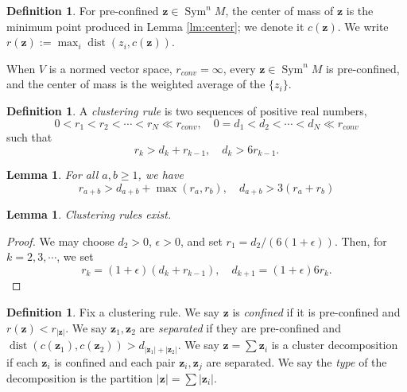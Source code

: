 \documentclass{article}
\def\C{\mathbb{C}}
\DeclareMathOperator{\Sym}{Sym}
\DeclareMathOperator{\dist}{dist}
\def\bz{\mathbf{z}} %
\newtheorem{lemma}[theorem]{Lemma}
\theoremstyle{definition}
\newtheorem{definition}
[theorem]{Definition}
\begin{document}
\begin{definition}
    For pre-confined $\bz \in \Sym^n M$,  the center of mass of $\bz$ is the minimum point produced in Lemma \ref{lm:center}; we denote it $c(\bz)$.  We write $r(\bz) := \max_{i} \dist(z_i, c(\mathbf{z}))$. 
\end{definition}

When $V$ is a normed vector space, $r_{conv} = \infty$, every $\mathbf{z} \in \Sym^n M$ is pre-confined, and the center of mass is the weighted average of the $\{z_i\}$. 




\begin{definition} \label{def: clustering rule}
    A {\em clustering rule} is two sequences of positive real numbers, 
    $$ 0 < r_1 < r_2  <\cdots < r_N \ll r_{conv}, \quad 0 = d_1 < d_2 < \cdots < d_N \ll r_{conv}$$
    such that 
    $$ r_k > d_k + r_{k-1}, \quad d_k > 6 r_{k-1}. $$ 
\end{definition}
\begin{lemma}
        For all $a,b \geq 1$, we have
$$ r_{a+b} > d_{a+b} + \max(r_a, r_b), \quad d_{a+b} > 3 (r_a + r_b)$$
\end{lemma}
\begin{lemma}
Clustering rules exist. 
\end{lemma}
\begin{proof}
We may choose $d_2 > 0$, $\epsilon > 0$, and set $r_1 = d_2/(6(1+\epsilon))$.  Then,  for $k = 2, 3, \cdots$, we set  
$$ r_k = (1+\epsilon) (d_k +  r_{k-1}), \quad d_{k+1} = (1+\epsilon) 6 r_{k}. $$ 
\end{proof}



\begin{definition} \label{def:clusters}
Fix a clustering rule.  We say $\mathbf{z}$ is {\em confined} if it is pre-confined and  $r(\mathbf{z}) < r_{|\mathbf{z}|}$.  We say $\mathbf{z}_1, \mathbf{z}_2$ are {\em separated} if they are pre-confined and  $\dist(c(\mathbf{z}_1), c(\mathbf{z}_2)) > d_{|\mathbf{z}_1| + |\mathbf{z}_2|}$. 
We say $\mathbf{z} = \sum \mathbf{z}_i$ is a cluster decomposition if each $\mathbf{z}_i$ is confined and each pair $\mathbf{z}_i, \mathbf{z}_j$ are separated.  We say the {\em type} of the decomposition is the partition 
$|\mathbf{z}| = \sum |\mathbf{z}_i|$.  
\end{definition}
\end{document}
